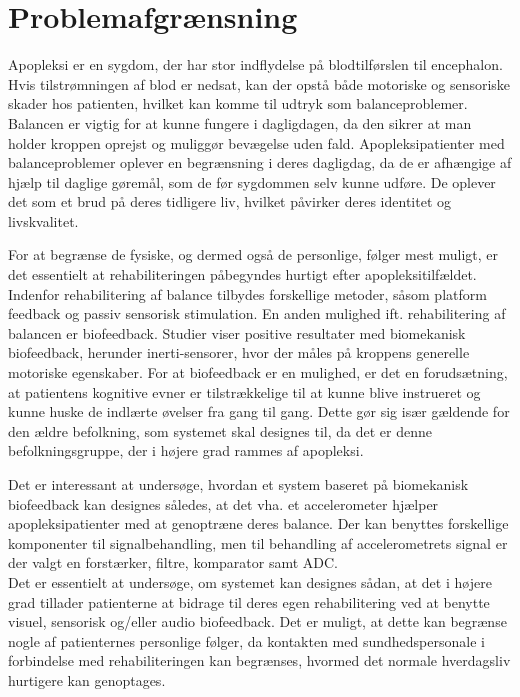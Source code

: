 \section{Problemafgrænsning}
Apopleksi er en sygdom, der har stor indflydelse på blodtilførslen til encephalon. Hvis tilstrømningen af blod er nedsat, kan der opstå både motoriske og sensoriske skader hos patienten, hvilket kan komme til udtryk som balanceproblemer. Balancen er vigtig for at kunne fungere i dagligdagen, da den sikrer at man holder kroppen oprejst og muliggør bevægelse uden fald. \cite{Nichols1997} Apopleksipatienter med balanceproblemer oplever en begrænsning i deres dagligdag, da de er afhængige af hjælp til daglige gøremål, som de før sygdommen selv kunne udføre. De oplever det som et brud på deres tidligere liv, hvilket påvirker deres identitet og livskvalitet. \cite{Sundhedsstyrelsen2010}

For at begrænse de fysiske, og dermed også de personlige, følger mest muligt, er det essentielt at rehabiliteringen påbegyndes hurtigt efter apopleksitilfældet. Indenfor rehabilitering af balance tilbydes forskellige metoder, såsom platform feedback og passiv sensorisk stimulation. En anden mulighed ift. rehabilitering af balancen er biofeedback. Studier viser positive resultater med biomekanisk biofeedback, herunder inerti-sensorer, hvor der måles på kroppens generelle motoriske egenskaber. \cite{Giggins2013} For at biofeedback er en mulighed, er det en forudsætning, at patientens kognitive evner er tilstrækkelige til at kunne blive instrueret og kunne huske de indlærte øvelser fra gang til gang. \cite{Middaugh1989} Dette gør sig især gældende for den ældre befolkning, som systemet skal designes til, da det er denne befolkningsgruppe, der i højere grad rammes af apopleksi. \cite{Sundhedsstyrelsen2011}

Det er interessant at undersøge, hvordan et system baseret på biomekanisk biofeedback kan designes således, at det vha. et accelerometer hjælper apopleksipatienter med at genoptræne deres balance. Der kan benyttes forskellige komponenter til signalbehandling, men til behandling af accelerometrets signal er der valgt en forstærker, filtre, komparator samt ADC. \\
Det er essentielt at undersøge, om systemet kan designes sådan, at det i højere grad tillader patienterne at bidrage til deres egen rehabilitering ved at benytte visuel, sensorisk og/eller audio biofeedback. Det er muligt, at dette kan begrænse nogle af patienternes personlige følger, da kontakten med sundhedspersonale i forbindelse med rehabiliteringen kan begrænses, hvormed det normale hverdagsliv hurtigere kan genoptages. 

